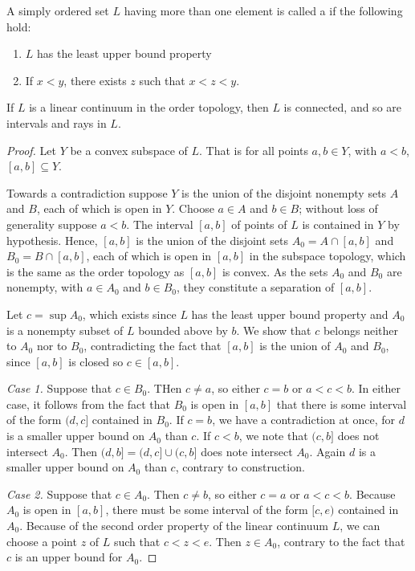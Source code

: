 \documentclass[12pt, a4paper, oneside, openright, titlepage]{book}
\begin{document}
\begin{definition}
    A simply ordered set $L$ having more than one element is called a  if the following hold: \begin{enumerate}
        \item $L$ has the least upper bound property
        \item If $x < y$, there exists $z$ such that $x < z < y$.
    \end{enumerate}
\end{definition}

\begin{theorem}
    If $L$ is a linear continuum in the order topology, then $L$ is connected, and so are intervals and rays in $L$.
\end{theorem}
\begin{proof}
    Let $Y$ be a convex subspace of $L$. That is for all points $a,b \in Y$, with $a<b$, $[a,b] \subseteq Y$.

    Towards a contradiction suppose $Y$ is the union of the disjoint nonempty sets $A$ and $B$, each of which is open in $Y$. Choose $a \in A$ and $b \in B$; without loss of generality suppose $a < b$. The interval $[a,b]$ of points of $L$ is contained in $Y$ by hypothesis. Hence, $[a,b]$ is the union of the disjoint sets $A_0 = A\cap [a,b]$ and $B_0 = B\cap[a,b]$, each of which is open in $[a,b]$ in the subspace topology, which is the same as the order topology as $[a,b]$ is convex. As the sets $A_0$ and $B_0$ are nonempty, with $a \in A_0$ and $b \in B_0$, they constitute a separation of $[a,b]$.

    Let $c = \sup A_0$, which exists since $L$ has the least upper bound property and $A_0$ is a nonempty subset of $L$ bounded above by $b$. We show that $c$ belongs neither to $A_0$ nor to $B_0$, contradicting the fact that $[a,b]$ is the union of $A_0$ and $B_0$, since $[a,b]$ is closed so $c\in[a,b]$.


    \emph{Case 1.} Suppose that $c \in B_0$. THen $c \neq a$, so either $c = b$ or $a < c < b$. In either case, it follows from the fact that $B_0$ is open in $[a,b]$ that there is some interval of the form $(d,c]$ contained in $B_0$. If $c = b$, we have a contradiction at once, for $d$ is a smaller upper bound on $A_0$ than $c$. If $c < b$, we note that $(c,b]$ does not intersect $A_0$. Then $(d,b] = (d,c] \cup (c,b]$ does note intersect $A_0$. Again $d$ is a smaller upper bound on $A_0$ than $c$, contrary to construction.


    \emph{Case 2.} Suppose that $c \in A_0$. Then $c \neq b$, so either $c = a$ or $a < c < b$. Because $A_0$ is open in $[a,b]$, there must be some interval of the form $[c,e)$ contained in $A_0$. Because of the second order property of the linear continuum $L$, we can choose a point $z$ of $L$ such that $c < z < e$. Then $z \in A_0$, contrary to the fact that $c$ is an upper bound for $A_0$.
\end{proof}
\end{document}
